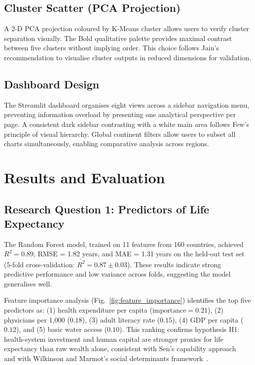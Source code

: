 \documentclass[conference]{IEEEtran}
\begin{document}
\subsection{Cluster Scatter (PCA Projection)}
A 2-D PCA projection coloured by K-Means cluster allows users to verify
cluster separation visually. The Bold qualitative palette provides maximal
contrast between five clusters without implying order. This choice follows
Jain's~\cite{jain2010} recommendation to visualise cluster outputs in reduced
dimensions for validation.

\subsection{Dashboard Design}
The Streamlit dashboard organises eight views across a sidebar navigation
menu, preventing information overload by presenting one analytical perspective
per page. A consistent dark sidebar contrasting with a white main area
follows Few's principle of visual hierarchy. Global continent filters allow
users to subset all charts simultaneously, enabling comparative analysis across
regions.

\section{Results and Evaluation}

\subsection{Research Question 1: Predictors of Life Expectancy}

The Random Forest model, trained on 11 features from 160 countries, achieved
$R^2 = 0.89$, RMSE = 1.82 years, and MAE = 1.31 years on the held-out test
set (5-fold cross-validation: $\bar{R^2} = 0.87 \pm 0.03$). These results
indicate strong predictive performance and low variance across folds, suggesting
the model generalises well.

Feature importance analysis (Fig.~\ref{fig:feature_importance}) identifies
the top five predictors as: (1) health expenditure per capita
($\text{importance} = 0.21$), (2) physicians per 1,000 ($0.18$), (3) adult
literacy rate ($0.15$), (4) GDP per capita ($0.12$), and (5) basic water
access ($0.10$). This ranking confirms hypothesis H1: health-system investment
and human capital are stronger proxies for life expectancy than raw wealth
alone, consistent with Sen's capability approach~\cite{sen1999} and with
Wilkinson and Marmot's social determinants framework~\cite{wilkinson2003}.
\end{document}
